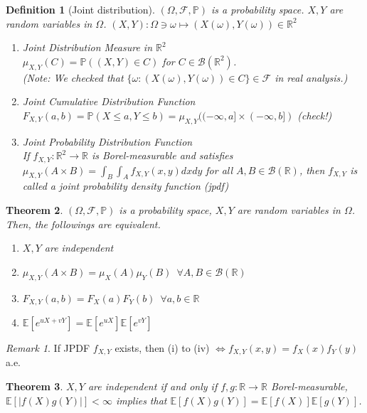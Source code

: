\documentclass[12pt]{report}
\newcommand{\R}{\mathbb{R}}
\renewcommand{\P}{\mathbb{P}}
\newcommand{\F}{\mathcal{F}}
\renewcommand{\1}{\mathbb{1}}
\renewcommand{\O}{\Omega}
\renewcommand{\r}{\rightarrow}
\theoremstyle{break}
\newtheorem{thm}{Theorem}[section] %
\theoremstyle{newdef}
\newtheorem{defn}[thm]{Definition} %
\theoremstyle{remark}
\newtheorem*{rem}{Remark} %
\begin{document}
\begin{defn}[Joint distribution]
$(\O, \F, \P)$ is a probability space. $X, Y$ are random variables in $\Omega$.
$(X, Y) : \O \ni \omega \mapsto (X(\omega), Y(\omega)) \in \R^2$
\begin{enumerate}
\item Joint Distribution Measure in $\R^2$\\
$\mu_{X,Y}(C) = \P((X,Y) \in C) $
for $C \in \mathcal{B}(\R^2)$.\\
(Note: We checked that $\{\omega : (X(\omega), Y(\omega)) \in C \} \in \mathcal{F}$ in real analysis.)

\item Joint Cumulative Distribution Function\\
$F_{X,Y}(a,b) = \P( X \leq a, Y \leq b) = \mu_{X,Y} ((-\infty, a] \times (-\infty, b])$ (check!)

\item Joint Probability Distribution Function\\
If $f_{X,Y} : \R^2 \r \R$ is Borel-measurable and satisfies
$\mu_{X,Y}(A\times B) = \int_B\int_A f_{X,Y}(x,y)dxdy$ for all $A, B \in \mathcal{B}(\R)$, then $f_{X,Y}$ is called a joint probability density function (jpdf)
\end{enumerate}
\end{defn}


\begin{thm}
$(\O,\F,\P)$ is a probability space, $X, Y$ are random variables in $\Omega$. Then, the followings are equivalent.
\begin{enumerate}[label=(\roman*)]
\item $X,Y$ are independent
\item $\mu_{X,Y}(A\times B) = \mu_X(A)\mu_Y(B) \enspace \forall A,B \in \mathcal{B}(\R)$
\item $F_{X,Y}(a,b) = F_X(a)F_Y(b) \enspace \forall a,b\in\R$
\item $\mathbb{E}[e^{uX+vY}] = \mathbb{E}[e^{uX}] \mathbb{E}[e^{vY}]$
\end{enumerate}
\end{thm}

\begin{rem}
If JPDF $f_{X,Y}$ exists, then (i) to (iv) $\Leftrightarrow f_{X,Y}(x,y) = f_X(x)f_Y(y)$ a.e.
\end{rem}

\begin{thm}
$X,Y$ are independent if and only if
$f, g : \R \r \R$ Borel-measurable, $\mathbb{E}[|f(X)g(Y)|] < \infty$ implies that
$\mathbb{E}[f(X)g(Y)] = \mathbb{E}[f(X)]\mathbb{E}[g(Y)]$.
\end{thm}
\end{document}

